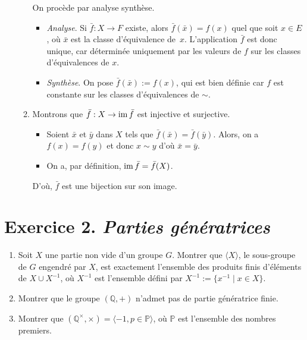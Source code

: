 \documentclass[./main]{subfiles}
\begin{document}
\begin{enumerate}
\begin{enumerate}
          On procède par analyse synthèse.
          \begin{itemize}
            \item {\color{deepblue}\textit{Analyse}.}
              Si $\bar{f} : X \to F$ existe, alors $\bar{f}(\bar{x}) = f(x)$ quel que soit $x \in E$, où $\bar{x}$ est la classe d'équivalence de~$x$.
              L'application $\bar{f}$ est donc unique, car déterminée uniquement par les valeurs de $f$ sur les classes d'équivalences de $x$.
            \item {\color{deepblue}\textit{Synthèse}.}
              On pose $\bar{f}(\bar{x}) := f(x)$, qui est bien définie car $f$ est constante sur les classes d'équivalences de $\sim$.
          \end{itemize}
        \item Montrons que $\bar{f} : X \to \operatorname{im} \bar{f}$ est injective et surjective.
          \begin{itemize}
            \item Soient $\bar{x}$ et $\bar{y}$ dans $X$ tels que $\bar{f}(\bar{x}) = \bar{f}(\bar{y})$.
              Alors, on a $f(x) = f(y)$ et donc  $x \sim y$ d'où  $\bar{x} = \bar{y}$.
            \item On a, par définition, $\operatorname{im} \bar{f} = \bar{f}(X)$.
          \end{itemize}
          D'où, $\bar{f}$ est une bijection sur son image.
      \end{enumerate}
  \end{enumerate}

  \section{Exercice 2. \textit{Parties génératrices}}

  \begin{enonce}
    \begin{enumerate}
      \item Soit $X$ une partie non vide d'un groupe $G$. Montrer que $\langle X\rangle$, le sous-groupe de $G$ engendré par $X$, est exactement l'ensemble des produits finis d'éléments de $X \cup X^{-1}$, où $X^{-1}$ est l'ensemble défini par $X^{-1} := \{x^{-1}  \mid x \in X\}$.\label{td1-ex2-Q1}
      \item Montrer que le groupe $(\mathds{Q}, +)$ n'admet pas de partie génératrice finie.
      \item Montrer que $(\mathds{Q}^\times, \times) = \langle -1, p \in \mathds{P} \rangle$, où $\mathds{P}$ est l'ensemble des nombres premiers.
    \end{enumerate}
  \end{enonce}
\end{document}
